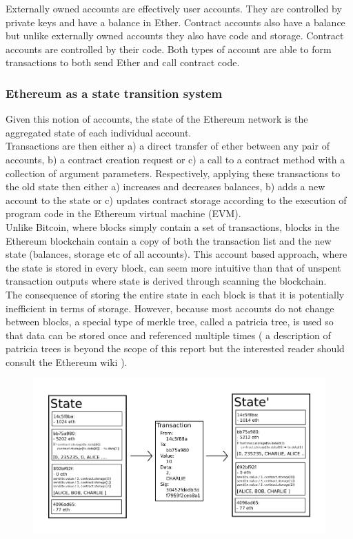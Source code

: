 Externally owned accounts are effectively user accounts. They are controlled by private keys and have a balance in Ether. Contract accounts also have a balance but unlike externally owned accounts they also have code and storage. Contract accounts are controlled by their code. Both types of account are able to form transactions to both send Ether and call contract code.\\

\subsubsection{Ethereum as a state transition system}
Given this notion of accounts, the state of the Ethereum network is the aggregated state of each individual account. \\

Transactions are then either a) a direct transfer of ether between any pair of accounts, b) a contract creation request or c) a call to a contract method with a collection of argument parameters. Respectively, applying these transactions to the old state then either a) increases and decreases balances, b) adds a new account to the state or c) updates contract storage according to the execution of program code in the Ethereum virtual machine (EVM). \\

Unlike Bitcoin, where blocks simply contain a set of transactions, blocks in the Ethereum blockchain contain a copy of both the transaction list and the new state (balances, storage etc of all accounts). This account based approach, where the state is stored in every block, can seem more intuitive than that of unspent transaction outputs where state is derived through scanning the blockchain.\\

The consequence of storing the entire state in each block is that it is potentially inefficient in terms of storage. However, because most accounts do not change between blocks, a special type of merkle tree, called a patricia tree, is used so that data can be stored once and referenced multiple times ( a description of patricia trees is beyond the scope of this report but the interested reader should consult the Ethereum wiki \cite{Patricia}).\\

\begin{figure}
\centering
\includegraphics[width=\textwidth]{Figures/ethereum_transition}
\decoRule
\caption[]{}
\label{fig:ethereum_transition}
\end{figure}

